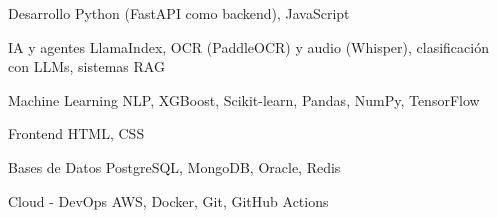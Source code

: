 
\begin{cvskills}

\cvskill
{Desarrollo}
{Python (FastAPI como backend), JavaScript}

\cvskill
{IA y agentes}
{LlamaIndex, OCR (PaddleOCR) y audio (Whisper), clasificación con LLMs, sistemas RAG}

\cvskill
{Machine Learning}
{NLP, XGBoost, Scikit-learn, Pandas, NumPy, TensorFlow}

\cvskill
{Frontend}
{HTML, CSS}

\cvskill
{Bases de Datos}
{PostgreSQL, MongoDB, Oracle, Redis}

\cvskill
{Cloud - DevOps}
{AWS, Docker, Git, GitHub Actions}

\end{cvskills}
